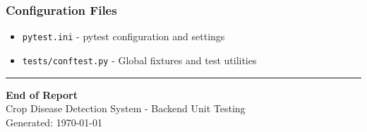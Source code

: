 \documentclass[12pt,a4paper]{article}
\begin{document}
\subsubsection*{Configuration Files}
\begin{itemize}
    \item \texttt{pytest.ini} - pytest configuration and settings
    \item \texttt{tests/conftest.py} - Global fixtures and test utilities
\end{itemize}

\vfill
\hrule
\vspace{0.3cm}
\begin{center}
\textbf{End of Report}\\
Crop Disease Detection System - Backend Unit Testing\\
Generated: \today
\end{center}
\end{document}
